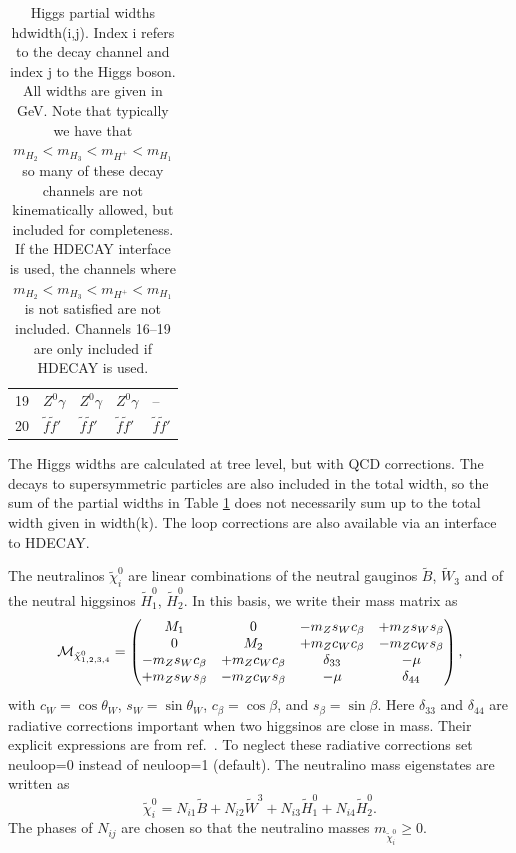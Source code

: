 \documentclass[a4paper,10pt,oneside]{book}
\newcommand{\code}[1]{\ft{#1}}
\newcommand{\ft}[1]{\textsf{#1}}
\begin{document}
\begin{table}
\begin{tabular}{lllll}
19 & $Z^0 \gamma$        & $Z^0 \gamma$        & $Z^0 \gamma$        & --\\
20 & $\tilde{f} \tilde{f}'$ & $\tilde{f} \tilde{f}'$ & $\tilde{f} \tilde{f}'$ & $\tilde{f} \tilde{f}'$\\ \hline
\end{tabular}
\caption{Higgs partial widths \code{hdwidth(i,j)}. Index \code{i} refers to the decay channel and index \code{j} to the Higgs boson. All widths are given in GeV\@. Note that typically we have that $m_{H_2}< m_{H_3}<m_{H^+}<m_{H_1}$ so many of these decay channels are not kinematically allowed, but included for completeness. If the \code{HDECAY} interface is used, the channels where $m_{H_2}< m_{H_3}<m_{H^+}<m_{H_1}$ is not satisfied are not included. Channels 16--19 are only included if HDECAY is used.}
\label{tab:hwidth}
\end{table}

The Higgs widths are calculated at tree level, but with QCD corrections. The decays to supersymmetric particles are also included in the total width, so the sum of the partial widths in Table \ref{tab:hwidth} does not necessarily sum up to the total width given in \code{width(k)}. The loop corrections are also available via an interface to \code{HDECAY}.

  
The neutralinos $ \tilde{\chi}^0_i$ are linear combinations of the neutral
gauginos ${\tilde B}$, ${\tilde W_3}$ and of the neutral higgsinos ${\tilde
  H_1^0}$, ${\tilde H_2^0}$.  In this basis, we write their mass matrix as
\begin{eqnarray}
  {{\cal M}}_{\tilde \chi^0_{1,2,3,4}} = 
  \left( \begin{matrix} %
  {M_1} & 0 & -m_Z s_W c_\beta & +m_Z s_W s_\beta \cr
  0 & {M_2} & +m_Z c_W c_\beta & -m_Z c_W s_\beta \cr
  -m_Z s_W c_\beta & +m_Z c_W c_\beta & \delta_{33} & -\mu \cr
  +m_Z s_W s_\beta & -m_Z c_W s_\beta & -\mu & \delta_{44} \cr
  \end{matrix} %
  \right) ,
\end{eqnarray}
with $c_W=\cos\theta_W$, $s_W=\sin\theta_W$, $c_\beta=\cos\beta$, and
$s_\beta=\sin\beta$.  Here $\delta_{33}$ and $\delta_{44}$ are radiative
corrections important when two higgsinos are close in mass. Their explicit
expressions are from ref.~\cite{Drees:1996pk}. To neglect these radiative
corrections set \ft{neuloop}=0 instead of \ft{neuloop}=1 (default). The
neutralino mass eigenstates are written as
\begin{equation}
  \tilde{\chi}^0_i = 
  N_{i1} \tilde{B} + N_{i2} \tilde{W}^3 + 
  N_{i3} \tilde{H}^0_1 + N_{i4} \tilde{H}^0_2 .
\end{equation}
The phases of $N_{ij}$ are chosen so that the neutralino masses
$m_{\tilde{\chi}^0_i} \ge 0$.
\end{document}
